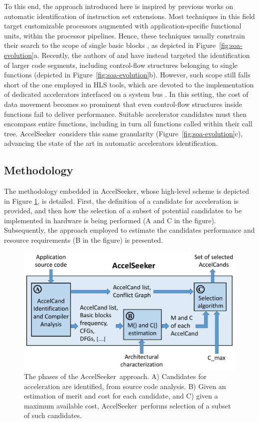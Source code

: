 \documentclass[]{usiinfthesis}
\newcommand{\aseeker}{{AccelSeeker}}
\begin{document}
To this end, the approach introduced here is inspired by previous works 
on automatic
identification of instruction set extensions. Most techniques in this
field target customizable processors augmented with
application-specific functional units, within the processor pipelines.
Hence, these techniques usually constrain their search to the scope of
single basic blocks \cite{PozziJul06} \cite{GiaquintaMar15}, as
depicted in Figure~\ref{fig:soa-evolution}a.  Recently, the authors of
\cite{ZacharopoulosApr19} and \cite{OppermannJul16} have instead
targeted the identification of larger code segments, including
control-flow structures belonging to single functions (depicted in
Figure~\ref{fig:soa-evolution}b).  However, such scope still falls
short of the one employed in HLS tools, which are devoted to the
implementation of dedicated accelerators interfaced on a system bus
\cite{CotaJun15}. In this setting, the cost of data movement becomes
so prominent that even control-flow structures inside functions fail
to deliver performance. Suitable accelerator candidates must then
encompass entire functions, including in turn all functions called
within their call tree. \aseeker\ considers this same granularity
(Figure~\ref{fig:soa-evolution}c), advancing the state of the art in
automatic accelerators identification.

\subsection{Methodology}

The methodology embedded in \aseeker, whose high-level scheme is depicted in Figure 
\ref{fig:flow}, is detailed.  
First, the definition of a candidate for acceleration is provided, and then how the 
selection of a subset of potential candidates to be implemented in hardware is being performed
(A and C in the figure). Subsequently, the approach employed to estimate the candidates 
performance and resource requirements (B in the figure) is presented.

\begin{figure}[!t]
  \centering
  \includegraphics[width= 0.7\linewidth]{figs/flow.pdf}
  \caption{The phases of the \aseeker\ approach. A) Candidates
          for acceleration are identified, from source code
          analysis. B) Given an estimation of merit and cost for each
          candidate, and C) given a maximum available cost, \aseeker\
          performs selection of a subset of such candidates.}
  \label{fig:flow}
\end{figure}
\end{document}
